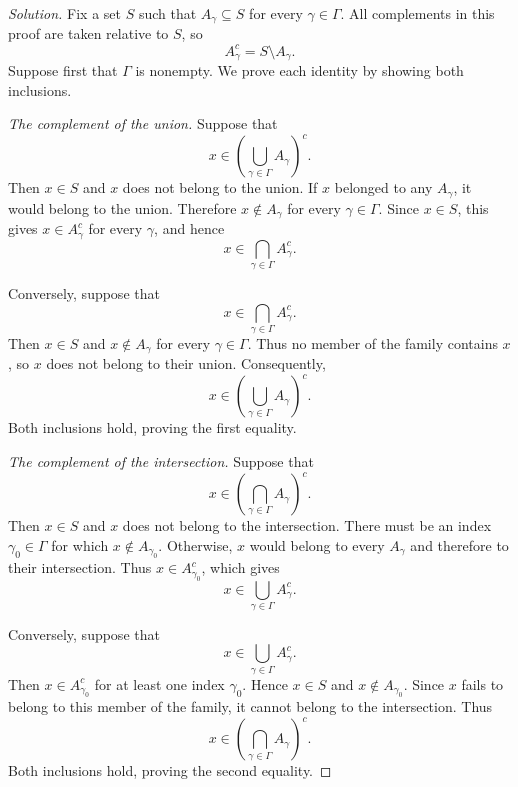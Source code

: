 
\begin{proof}[Solution]
Fix a set $S$ such that $A_\gamma\subseteq S$ for every
$\gamma\in\Gamma$. All complements in this proof are taken
relative to $S$, so
\[
  A_\gamma^c=S\setminus A_\gamma.
\]
Suppose first that $\Gamma$ is nonempty. We prove each identity
by showing both inclusions.

\begin{marginfigure}
  \centering
  
  \caption[De Morgan's laws.]{The upper shaded region lies outside both sets.
    In the lower panel, only the overlap is excluded. All complements
    are taken within the rectangle $S$.}
  \label{fig:hw01:de-morgan}
\end{marginfigure}

\textit{The complement of the union.}
Suppose that
\[
  x\in\left(\bigcup_{\gamma\in\Gamma}A_\gamma\right)^c.
\]
Then $x\in S$ and $x$ does not belong to the union.
If $x$ belonged to any $A_\gamma$, it would belong to the union.
Therefore $x\notin A_\gamma$ for every $\gamma\in\Gamma$.
Since $x\in S$, this gives $x\in A_\gamma^c$ for every $\gamma$,
and hence
\[
  x\in\bigcap_{\gamma\in\Gamma}A_\gamma^c.
\]

Conversely, suppose that
\[
  x\in\bigcap_{\gamma\in\Gamma}A_\gamma^c.
\]
Then $x\in S$ and $x\notin A_\gamma$ for every $\gamma\in\Gamma$. Thus no member of the family contains $x$, so $x$ does not belong
to their union. Consequently,
\[
  x\in\left(\bigcup_{\gamma\in\Gamma}A_\gamma\right)^c.
\]
Both inclusions hold, proving the first equality.

\handoutonly{\clearpage}

\textit{The complement of the intersection.}
Suppose that
\[
  x\in\left(\bigcap_{\gamma\in\Gamma}A_\gamma\right)^c.
\]
Then $x\in S$ and $x$ does not belong to the intersection.
There must be an index $\gamma_0\in\Gamma$ for which
$x\notin A_{\gamma_0}$. Otherwise, $x$ would belong to every
$A_\gamma$ and therefore to their intersection.
Thus $x\in A_{\gamma_0}^c$, which gives
\[
  x\in\bigcup_{\gamma\in\Gamma}A_\gamma^c.
\]

Conversely, suppose that
\[
  x\in\bigcup_{\gamma\in\Gamma}A_\gamma^c.
\]
Then $x\in A_{\gamma_0}^c$ for at least one index $\gamma_0$.
Hence $x\in S$ and $x\notin A_{\gamma_0}$.
Since $x$ fails to belong to this member of the family, it cannot
belong to the intersection. Thus
\[
  x\in\left(\bigcap_{\gamma\in\Gamma}A_\gamma\right)^c.
\]
Both inclusions hold, proving the second equality.


\end{proof}
